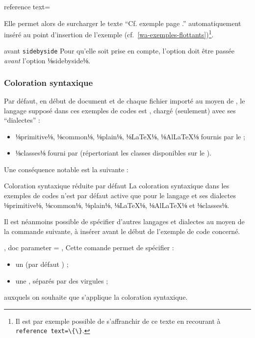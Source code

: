 \documentclass{letgut}
\begin{document}
\begin{itemize}
\begin{docKey*}{reference text}{=}{}
\begin{itemize}
    \end{itemize}
    Elle permet alors de surcharger le texte \enquote{Cf. exemple  page
      .} automatiquement inséré au point d'insertion de l'exemple
    (cf.~\vref{wa-exemples-flottants})\footnote{Il est par exemple possible de
      s'affranchir de ce texte en recourant à \lstinline+reference text=\{\}+.}.
    \begin{dbwarning}{ avant \lstinline+sidebyside+}{}
      Pour qu'elle soit prise en compte, l'option  doit
      être passée \emph{avant} l'option ⅛sidebyside⅛.
    \end{dbwarning}
  \end{docKey*}
\end{itemize}

\subsubsection{Coloration syntaxique}
\label{sec:coloration}

Par défaut, en début de document et de chaque fichier importé au moyen de
, le langage supposé dans ces exemples de codes est
, chargé (seulement) avec ses \enquote{dialectes} :
\begin{itemize}
\item ⅛primitive⅛, ⅛common⅛, ⅛plain⅛, ⅛LaTeX⅛, ⅛AlLaTeX⅛ fournis par le
   ;
\item ⅛classes⅛ fourni par  (répertoriant les classes disponibles
  sur le \ctan{}).
\end{itemize}
Une conséquence notable est la suivante :
\begin{dbwarning}{Coloration syntaxique réduite par défaut}{}
  La coloration syntaxique dans les exemples de codes n'est par défaut active
  que pour le langage  et ses dialectes ⅛primitive⅛, ⅛common⅛,
  ⅛plain⅛, ⅛LaTeX⅛, ⅛AlLaTeX⅛ et ⅛classes⅛.
\end{dbwarning}

Il est néanmoins possible de spécifier d'autres langages et dialectes au moyen
de la commande  suivante, à insérer avant le début de l'exemple
de code concerné.

\begin{docCommands}[
doc name = syntaxhl,
doc parameter = \marg{liste de dialectes},
]
{
  { },
  { doc parameter =  },
}
Cette comande permet de spécifier :
\begin{itemize}
\item un  (par défaut ) ;
\item une , séparés par des virgules ;
\end{itemize}
auxquels on souhaite que s'applique la coloration syntaxique.
\end{docCommands}
\end{document}
